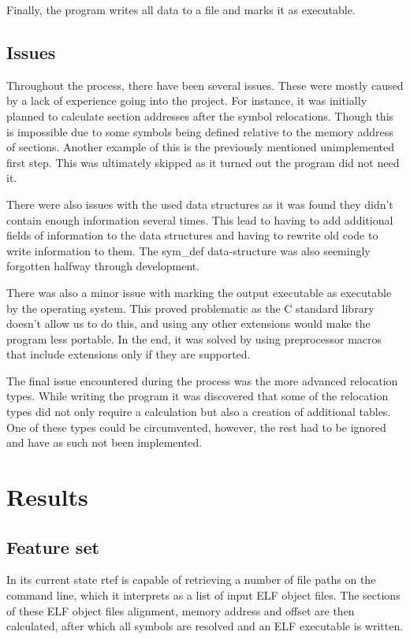 \documentclass{article}
\begin{document}
Finally, the program writes all data to a file and marks it as executable.

\subsection{Issues}

Throughout the process, there have been several issues. These were mostly caused by a lack of experience going into the project. For instance, it was initially planned to calculate section addresses after the symbol relocations. Though this is impossible due to some symbols being defined relative to the memory address of sections. Another example of this is the previously mentioned unimplemented first step. This was ultimately skipped as it turned out the program did not need it.

There were also issues with the used data structures as it was found they didn't contain enough information several times. This lead to having to add additional fields of information to the data structures and having to rewrite old code to write information to them. The sym\_def data-structure was also seemingly forgotten halfway through development.

There was also a minor issue with marking the output executable as executable by the operating system. This proved problematic as the C standard library doesn't allow us to do this, and using any other extensions would make the program less portable. In the end, it was solved by using preprocessor macros that include extensions only if they are supported.

The final issue encountered during the process was the more advanced relocation types. While writing the program it was discovered that some of the relocation types did not only require a calculation but also a creation of additional tables. One of these types could be circumvented, however, the rest had to be ignored and have as such not been implemented.

\section{Results}

\subsection{Feature set}

In its current state rtef is capable of retrieving a number of file paths on the command line, which it interprets as a list of input ELF object files. The sections of these ELF object files alignment, memory address and offset are then calculated, after which all symbols are resolved and an ELF executable is written.
\end{document}
